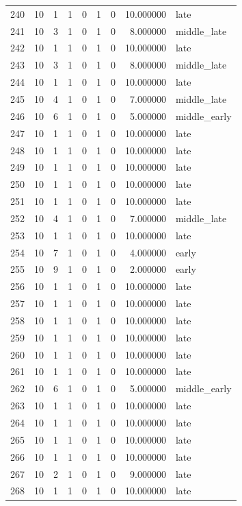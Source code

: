 \begin{longtable}{rrrrrrrrl}
240 & 10 & 1 & 1 & 0 & 1 & 0 & 10.000000 & late \\
241 & 10 & 3 & 1 & 0 & 1 & 0 & 8.000000 & middle\_late \\
242 & 10 & 1 & 1 & 0 & 1 & 0 & 10.000000 & late \\
243 & 10 & 3 & 1 & 0 & 1 & 0 & 8.000000 & middle\_late \\
244 & 10 & 1 & 1 & 0 & 1 & 0 & 10.000000 & late \\
245 & 10 & 4 & 1 & 0 & 1 & 0 & 7.000000 & middle\_late \\
246 & 10 & 6 & 1 & 0 & 1 & 0 & 5.000000 & middle\_early \\
247 & 10 & 1 & 1 & 0 & 1 & 0 & 10.000000 & late \\
248 & 10 & 1 & 1 & 0 & 1 & 0 & 10.000000 & late \\
249 & 10 & 1 & 1 & 0 & 1 & 0 & 10.000000 & late \\
250 & 10 & 1 & 1 & 0 & 1 & 0 & 10.000000 & late \\
251 & 10 & 1 & 1 & 0 & 1 & 0 & 10.000000 & late \\
252 & 10 & 4 & 1 & 0 & 1 & 0 & 7.000000 & middle\_late \\
253 & 10 & 1 & 1 & 0 & 1 & 0 & 10.000000 & late \\
254 & 10 & 7 & 1 & 0 & 1 & 0 & 4.000000 & early \\
255 & 10 & 9 & 1 & 0 & 1 & 0 & 2.000000 & early \\
256 & 10 & 1 & 1 & 0 & 1 & 0 & 10.000000 & late \\
257 & 10 & 1 & 1 & 0 & 1 & 0 & 10.000000 & late \\
258 & 10 & 1 & 1 & 0 & 1 & 0 & 10.000000 & late \\
259 & 10 & 1 & 1 & 0 & 1 & 0 & 10.000000 & late \\
260 & 10 & 1 & 1 & 0 & 1 & 0 & 10.000000 & late \\
261 & 10 & 1 & 1 & 0 & 1 & 0 & 10.000000 & late \\
262 & 10 & 6 & 1 & 0 & 1 & 0 & 5.000000 & middle\_early \\
263 & 10 & 1 & 1 & 0 & 1 & 0 & 10.000000 & late \\
264 & 10 & 1 & 1 & 0 & 1 & 0 & 10.000000 & late \\
265 & 10 & 1 & 1 & 0 & 1 & 0 & 10.000000 & late \\
266 & 10 & 1 & 1 & 0 & 1 & 0 & 10.000000 & late \\
267 & 10 & 2 & 1 & 0 & 1 & 0 & 9.000000 & late \\
268 & 10 & 1 & 1 & 0 & 1 & 0 & 10.000000 & late \\

\end{longtable}
